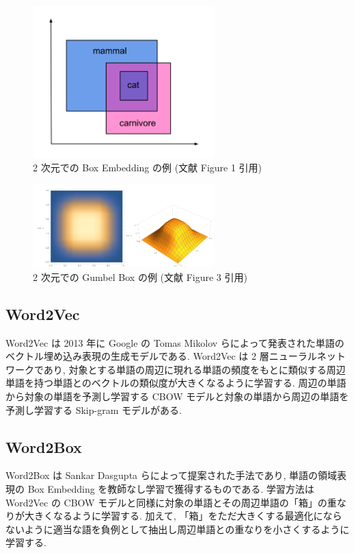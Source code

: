 \documentclass[twocolumn]{jarticle}     %
\begin{document}
\begin{figure}[t]
  \centering
  \caption{2 次元での Box Embedding の例 (文献\cite{li2018smoothing} Figure 1 引用)}
  \label{fig:box_embedding2d}
  \includegraphics[width=70mm]{BoxEmbedding_2d.png}
\end{figure}

\begin{figure}[t]
  \centering
  \caption{2 次元での Gumbel Box の例 (文献\cite{pmlr-v161-boratko21a} Figure 3 引用)}
  \label{fig:gumbel_box}
  \includegraphics[width=70mm]{GumbelBoxes.png}
\end{figure}

\subsection{Word2Vec}
Word2Vec \cite{word2vec} は 2013 年に Google の Tomas Mikolov らによって発表された単語のベクトル埋め込み表現の生成モデルである. 
Word2Vec は 2 層ニューラルネットワークであり, 対象とする単語の周辺に現れる単語の頻度をもとに類似する周辺単語を持つ単語とのベクトルの類似度が大きくなるように学習する. 
周辺の単語から対象の単語を予測し学習する CBOW モデルと対象の単語から周辺の単語を予測し学習する Skip-gram モデルがある.

\subsection{Word2Box}
Word2Box \cite{dasgupta-etal-2022-word2box} は Sankar Dasgupta らによって提案された手法であり, 単語の領域表現の Box Embedding を教師なし学習で獲得するものである. 
学習方法は Word2Vec の CBOW モデルと同様に対象の単語とその周辺単語の「箱」の重なりが大きくなるように学習する. 
加えて, 「箱」をただ大きくする最適化にならないように適当な語を負例として抽出し周辺単語との重なりを小さくするように学習する. 
\end{document}
